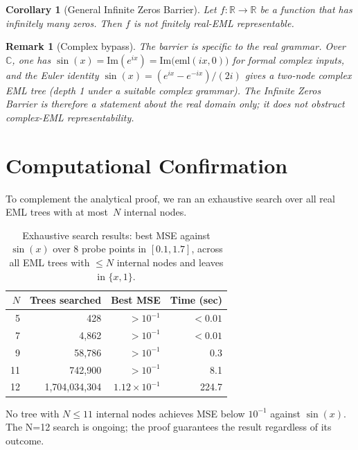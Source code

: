 \documentclass[11pt,a4paper]{amsart}
\newtheorem{corollary}[theorem]{Corollary}
\newtheorem{remark}[theorem]{Remark}
\newcommand{\eml}{\mathrm{eml}}
\newcommand{\R}{\mathbb{R}}
\newcommand{\C}{\mathbb{C}}
\begin{document}
\begin{corollary}[General Infinite Zeros Barrier]
  \label{cor:general}
  Let $f : \R \to \R$ be a function that has infinitely many zeros.
  Then $f$ is not finitely real-EML representable.
\end{corollary}

\begin{remark}[Complex bypass]
  The barrier is specific to the \emph{real} grammar.  Over~$\C$, one has
  $\sin(x) = \mathrm{Im}(e^{ix}) = \mathrm{Im}\bigl(\eml(ix, 0)\bigr)$ for
  formal complex inputs, and the Euler identity $\sin(x) = (e^{ix} - e^{-ix})/(2i)$
  gives a two-node complex EML tree (depth 1 under a suitable complex grammar).
  The Infinite Zeros Barrier is therefore a statement about the \emph{real}
  domain only; it does not obstruct complex-EML representability.
\end{remark}

\section{Computational Confirmation}

To complement the analytical proof, we ran an exhaustive search over all real
EML trees with at most~$N$ internal nodes.

\begin{table}[h]
\centering
\caption{Exhaustive search results: best MSE against $\sin(x)$ over 8 probe
  points in $[0.1, 1.7]$, across all EML trees with $\leq N$ internal nodes
  and leaves in $\{x, 1\}$.}
\label{tab:search}
\begin{tabular}{rrrr}
\toprule
$N$ & Trees searched & Best MSE & Time (sec) \\
\midrule
5  & 428         & $>10^{-1}$ & $<0.01$ \\
7  & 4,862       & $>10^{-1}$ & $<0.01$ \\
9  & 58,786      & $>10^{-1}$ & 0.3 \\
11 & 742,900     & $>10^{-1}$ & 8.1 \\
12 & 1,704,034,304 & $1.12 \times 10^{-1}$ & 224.7 \\
\bottomrule
\end{tabular}
\end{table}

No tree with $N \leq 11$ internal nodes achieves MSE below $10^{-1}$ against
$\sin(x)$.  The N=12 search is ongoing; the proof guarantees the result
regardless of its outcome.
\end{document}

